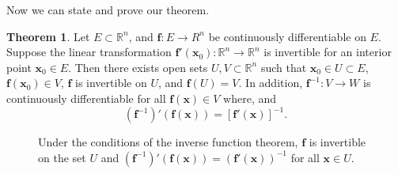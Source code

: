 \documentclass{article}
\newcommand{\R}{\mathbb{R}}
\newcommand{\x}{\mathbf{x}}
\newcommand{\f}{\mathbf{f}}
\theoremstyle{definition}
\newtheorem{theorem}{Theorem}[section]
\begin{document}
Now we can state and prove our theorem.
\begin{theorem}
	Let $ E\subset \R^n $, and $ \f:E\to R^n $ be continuously differentiable on $ E $. Suppose the linear transformation $ \f'(\x_0):\R^n\to\R^n$ is invertible for an interior point $ \x_0\in E $.  Then there exists open sets $ U,V\subset \R^n $ such that $ \x_0\in U\subset E $, $ \f(\x_0)\in V $, $ \f $ is invertible on $ U $, and $ \f(U)=V $. In addition,  $ \f^{-1}:V\to W$ is continuously differentiable for all $ \f(\x) \in V $ where, and 
	$$ (\f^{-1})'(\f(\x)) = [\f'(\x)]^{-1}.$$
\end{theorem}
	\begin{figure}[h!]
	\centering
	\caption{Under the conditions of the inverse function theorem, $ \f $ is invertible on the set $ U $ and $  (\f^{-1})'(\f(\x)) = (\f'(\x))^{-1} $ for all $ \x\in U $.}
\end{figure}	
\end{document}
